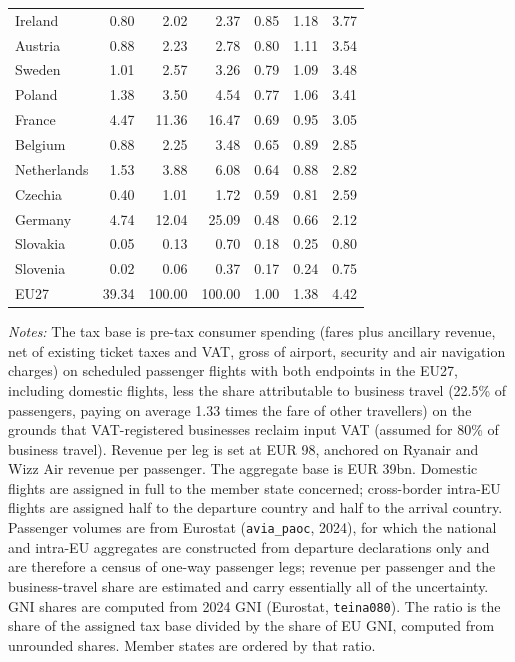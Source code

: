 \documentclass[../../main]{subfiles}
\begin{document}
\begin{table}[htbp]
\begin{tabular}{lrrrrrr}
Ireland        &   0.80 &   2.02 &   2.37 &   0.85 &   1.18 &   3.77 \\
Austria        &   0.88 &   2.23 &   2.78 &   0.80 &   1.11 &   3.54 \\
Sweden         &   1.01 &   2.57 &   3.26 &   0.79 &   1.09 &   3.48 \\
Poland         &   1.38 &   3.50 &   4.54 &   0.77 &   1.06 &   3.41 \\
France         &   4.47 &  11.36 &  16.47 &   0.69 &   0.95 &   3.05 \\
Belgium        &   0.88 &   2.25 &   3.48 &   0.65 &   0.89 &   2.85 \\
Netherlands    &   1.53 &   3.88 &   6.08 &   0.64 &   0.88 &   2.82 \\
Czechia        &   0.40 &   1.01 &   1.72 &   0.59 &   0.81 &   2.59 \\
Germany        &   4.74 &  12.04 &  25.09 &   0.48 &   0.66 &   2.12 \\
Slovakia       &   0.05 &   0.13 &   0.70 &   0.18 &   0.25 &   0.80 \\
Slovenia       &   0.02 &   0.06 &   0.37 &   0.17 &   0.24 &   0.75 \\
\midrule
EU27           &  39.34 & 100.00 & 100.00 &   1.00 &   1.38 &   4.42 \\
\bottomrule
\end{tabular}
\vspace{0.5em}
\begin{minipage}{\textwidth}
\footnotesize
\emph{Notes:} The tax base is pre-tax consumer spending (fares plus ancillary
revenue, net of existing ticket taxes and VAT, gross of airport, security and
air navigation charges) on scheduled passenger flights with both endpoints in
the EU27, including domestic flights, less the share attributable to business
travel (22.5\% of passengers, paying on average 1.33 times the fare of other
travellers) on the grounds that VAT-registered businesses reclaim input VAT
(assumed for 80\% of business travel). Revenue per leg is set at EUR 98,
anchored on Ryanair and Wizz Air revenue per passenger. The aggregate base is
EUR 39bn.
Domestic flights are assigned in full to the member state concerned;
cross-border intra-EU flights are assigned half to the departure country and
half to the arrival country. Passenger volumes are from Eurostat
(\texttt{avia\_paoc}, 2024), for which the national and intra-EU aggregates are
constructed from departure declarations only and are therefore a census of
one-way passenger legs; revenue per passenger and the business-travel share are
estimated and carry essentially all of the uncertainty. GNI shares are computed
from 2024 GNI (Eurostat, \texttt{teina080}). The ratio is
the share of the assigned tax base divided by the share of EU GNI, computed
from unrounded shares. Member states are ordered by that ratio.


\end{minipage}
\end{table}
\end{document}
